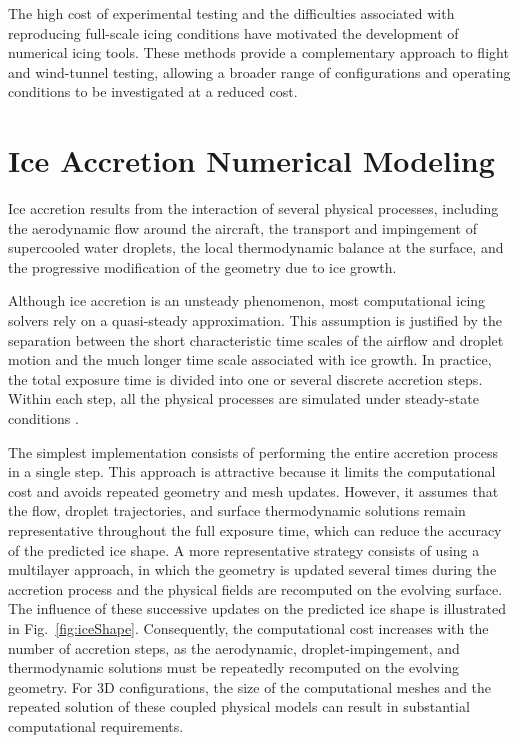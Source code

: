The high cost of experimental testing and the difficulties associated with reproducing full-scale icing conditions have motivated the development of numerical icing tools. These methods provide a complementary approach to flight and wind-tunnel testing, allowing a broader range of configurations and operating conditions to be investigated at a reduced cost.

\section{Ice Accretion Numerical Modeling}\label{sec:IceAccretionNumericalModeling}

Ice accretion results from the interaction of several physical processes, including the aerodynamic flow around the aircraft, the transport and impingement of supercooled water droplets, the local thermodynamic balance at the surface, and the progressive modification of the geometry due to ice growth.

Although ice accretion is an unsteady phenomenon, most computational icing solvers rely on a quasi-steady approximation. This assumption is justified by the separation between the short characteristic time scales of the airflow and droplet motion and the much longer time scale associated with ice growth. In practice, the total exposure time is divided into one or several discrete accretion steps. Within each step, all the physical processes are simulated under steady-state conditions \cite{guardoneReview}.

The simplest implementation consists of performing the entire accretion process in a single step. This approach is attractive because it limits the computational cost and avoids repeated geometry and mesh updates. However, it assumes that the flow, droplet trajectories, and surface thermodynamic solutions remain representative throughout the full exposure time, which can reduce the accuracy of the predicted ice shape. A more representative strategy consists of using a multilayer approach, in which the geometry is updated several times during the accretion process and the physical fields are recomputed on the evolving surface. The influence of these successive updates on the predicted ice shape is illustrated in Fig.~\ref{fig:iceShape}. Consequently, the computational cost increases with the number of accretion steps, as the aerodynamic, droplet-impingement, and thermodynamic solutions must be repeatedly recomputed on the evolving geometry. For 3D configurations, the size of the computational meshes and the repeated solution of these coupled physical models can result in substantial computational requirements.

